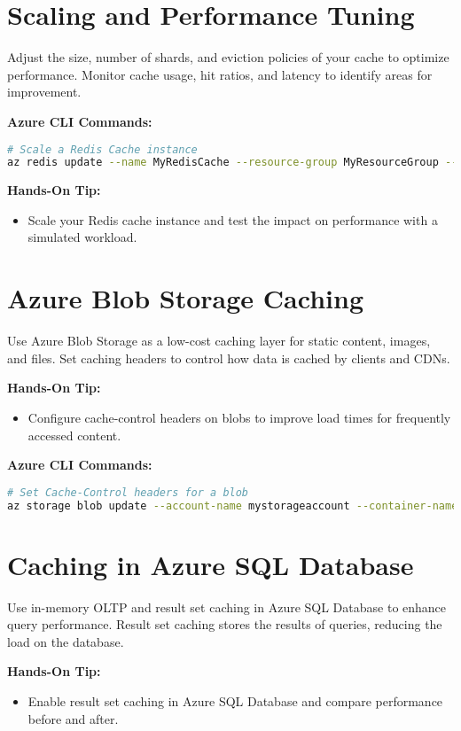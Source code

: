 \documentclass{article}
\begin{document}
\section{Scaling and Performance Tuning}
Adjust the size, number of shards, and eviction policies of your cache to optimize performance. Monitor cache usage, hit ratios, and latency to identify areas for improvement.

\textbf{Azure CLI Commands:}
\begin{lstlisting}[language=bash]
# Scale a Redis Cache instance
az redis update --name MyRedisCache --resource-group MyResourceGroup --sku Premium --shard-count 2
\end{lstlisting}

\textbf{Hands-On Tip:}
\begin{itemize}
    \item Scale your Redis cache instance and test the impact on performance with a simulated workload.
\end{itemize}

\section{Azure Blob Storage Caching}
Use Azure Blob Storage as a low-cost caching layer for static content, images, and files. Set caching headers to control how data is cached by clients and CDNs.

\textbf{Hands-On Tip:}
\begin{itemize}
    \item Configure cache-control headers on blobs to improve load times for frequently accessed content.
\end{itemize}

\textbf{Azure CLI Commands:}
\begin{lstlisting}[language=bash]
# Set Cache-Control headers for a blob
az storage blob update --account-name mystorageaccount --container-name mycontainer --name myblob.txt --content-cache-control "public, max-age=3600"
\end{lstlisting}

\section{Caching in Azure SQL Database}
Use in-memory OLTP and result set caching in Azure SQL Database to enhance query performance. Result set caching stores the results of queries, reducing the load on the database.

\textbf{Hands-On Tip:}
\begin{itemize}
    \item Enable result set caching in Azure SQL Database and compare performance before and after.
\end{itemize}
\end{document}
